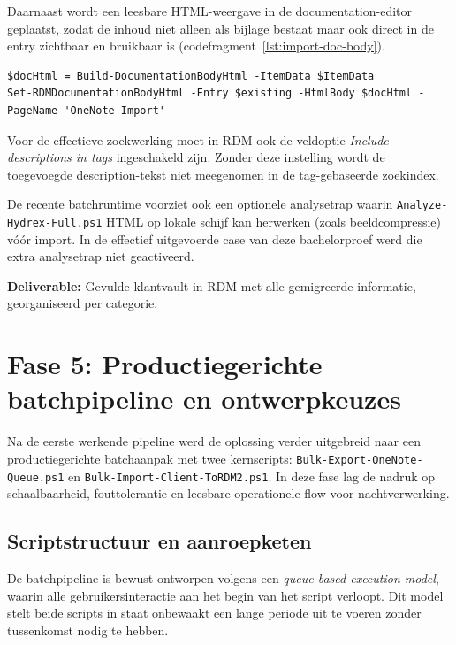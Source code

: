 Daarnaast wordt een leesbare HTML-weergave in de documentation-editor geplaatst, zodat de inhoud niet alleen als bijlage bestaat maar ook direct in de entry zichtbaar en bruikbaar is (codefragment~\ref{lst:import-doc-body}).

\begin{listing}[htbp]
\begin{lstlisting}
$docHtml = Build-DocumentationBodyHtml -ItemData $ItemData
Set-RDMDocumentationBodyHtml -Entry $existing -HtmlBody $docHtml -PageName 'OneNote Import'
\end{lstlisting}
\caption{Vullen van de documentation-editor met tekstuele OneNote-inhoud}
\label{lst:import-doc-body}
\end{listing}

Voor de effectieve zoekwerking moet in RDM ook de veldoptie \emph{Include descriptions in tags} ingeschakeld zijn. Zonder deze instelling wordt de toegevoegde description-tekst niet meegenomen in de tag-gebaseerde zoekindex.

De recente batchruntime voorziet ook een optionele analysetrap waarin \texttt{Analyze-Hydrex-Full.ps1} HTML op lokale schijf kan herwerken (zoals beeldcompressie) vóór import. In de effectief uitgevoerde case van deze bachelorproef werd die extra analysetrap niet geactiveerd.

\textbf{Deliverable:} Gevulde klantvault in RDM met alle gemigreerde informatie, georganiseerd per categorie.

\section{Fase 5: Productiegerichte batchpipeline en ontwerpkeuzes}
\label{sec:fase5-batchtopics}

Na de eerste werkende pipeline werd de oplossing verder uitgebreid naar een productiegerichte batchaanpak met twee kernscripts: \texttt{Bulk-Export-OneNote-Queue.ps1} en \texttt{Bulk-Import-Client-ToRDM2.ps1}. In deze fase lag de nadruk op schaalbaarheid, fouttolerantie en leesbare operationele flow voor nachtverwerking.

\subsection{Scriptstructuur en aanroepketen}
\label{subsec:topic-script-structuur}

De batchpipeline is bewust ontworpen volgens een \emph{queue-based execution model}, waarin alle gebruikersinteractie aan het begin van het script verloopt. Dit model stelt beide scripts in staat onbewaakt een lange periode uit te voeren zonder tussenkomst nodig te hebben.

